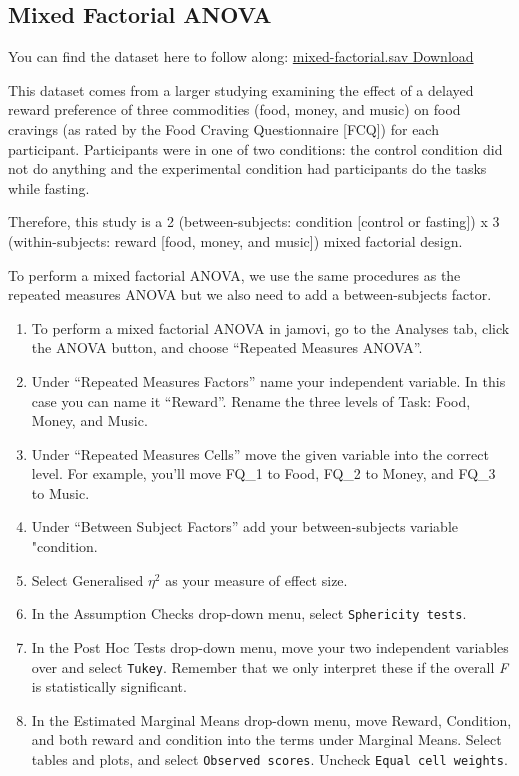 \documentclass[
]{book}
\begin{document}
\hypertarget{mixed-factorial-anova}{%
\subsection{Mixed Factorial ANOVA}\label{mixed-factorial-anova}}

You can find the dataset here to follow along: \href{https://github.com/danawanzer/stats-with-jamovi/blob/master/data/mixed-factorial.sav}{mixed-factorial.sav Download}

This dataset comes from a larger studying examining the effect of a delayed reward preference of three commodities (food, money, and music) on food cravings (as rated by the Food Craving Questionnaire {[}FCQ{]}) for each participant. Participants were in one of two conditions: the control condition did not do anything and the experimental condition had participants do the tasks while fasting.

Therefore, this study is a 2 (between-subjects: condition {[}control or fasting{]}) x 3 (within-subjects: reward {[}food, money, and music{]}) mixed factorial design.

To perform a mixed factorial ANOVA, we use the same procedures as the repeated measures ANOVA but we also need to add a between-subjects factor.

\begin{enumerate}
\def\labelenumi{\arabic{enumi}.}
\item
  To perform a mixed factorial ANOVA in jamovi, go to the Analyses tab, click the ANOVA button, and choose ``Repeated Measures ANOVA''.
\item
  Under ``Repeated Measures Factors'' name your independent variable. In this case you can name it ``Reward''. Rename the three levels of Task: Food, Money, and Music.
\item
  Under ``Repeated Measures Cells'' move the given variable into the correct level. For example, you'll move FQ\_1 to Food, FQ\_2 to Money, and FQ\_3 to Music.
\item
  Under ``Between Subject Factors'' add your between-subjects variable "condition.
\item
  Select Generalised \(\eta^2\) as your measure of effect size.
\item
  In the Assumption Checks drop-down menu, select \texttt{Sphericity\ tests}.
\item
  In the Post Hoc Tests drop-down menu, move your two independent variables over and select \texttt{Tukey}. Remember that we only interpret these if the overall \emph{F} is statistically significant.
\item
  In the Estimated Marginal Means drop-down menu, move Reward, Condition, and both reward and condition into the terms under Marginal Means. Select tables and plots, and select \texttt{Observed\ scores}. Uncheck \texttt{Equal\ cell\ weights}.
\end{enumerate}
\end{document}
